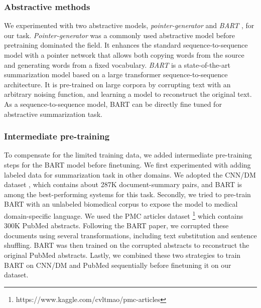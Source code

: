 \documentclass[letterpaper, table]{article} %
\begin{document}
\subsubsection{Abstractive methods}
We experimented with two abstractive models, \textit{pointer-generator} \cite{see2017get} and \textit{BART} \cite{lewis2019bart}, for our task. \textit{Pointer-generator} was a commonly used abstractive model before pretraining dominated the field. It enhances the standard sequence-to-sequence model with a pointer network that allows both copying words from the source and generating words from a fixed vocabulary. \textit{BART} is a state-of-the-art summarization model based on a large transformer sequence-to-sequence architecture. It is pre-trained on large corpora by corrupting text with an arbitrary noising function, and learning a model to reconstruct the original text.
As a sequence-to-sequence model, BART can be directly fine tuned for abstractive summarization task.
\subsubsection{Intermediate pre-training}
\label{sec:inter-pretraining}
To compensate for the limited training data, we added intermediate pre-training steps for the BART model before finetuning.
We first experimented with adding labeled data for summarization task in other domains. We adopted the CNN/DM dataset \cite{nallapati2016abstractive}, which contains about 287K document-summary pairs, and BART is among the best-performing systems for this task. %
Secondly, we tried to pre-train BART with an unlabeled biomedical corpus to expose the model to medical domain-specific language. We used the PMC articles dataset \footnote{https://www.kaggle.com/cvltmao/pmc-articles} 
which contains 300K PubMed abstracts. Following the BART paper, we corrupted these documents using several transformations, including text substitution and sentence shuffling. BART was then trained on the corrupted abstracts to reconstruct the original PubMed abstracts. Lastly, we combined these two strategies to train BART on CNN/DM and PubMed sequentially before finetuning it on our dataset.
\end{document}
